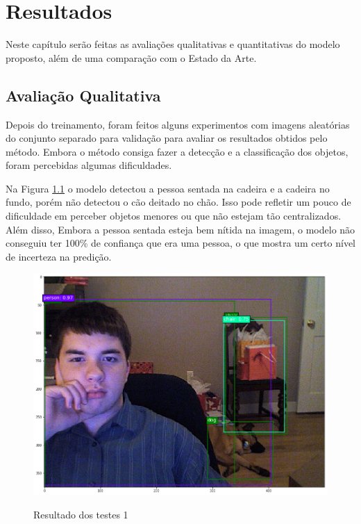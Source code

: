 \chapter{Resultados}
\label{cap:5}
\vspace{-1.9cm}

Neste capítulo serão feitas as avaliações qualitativas e quantitativas do modelo proposto, além de uma comparação com o Estado da Arte.

\vspace{-1.3cm}
\section{Avaliação Qualitativa}
\label{secao:5:1:2}

Depois do treinamento, foram feitos alguns experimentos com imagens aleatórias do conjunto separado para validação para avaliar os resultados obtidos pelo método. Embora o método consiga fazer a detecção e a classificação dos objetos, foram percebidas algumas dificuldades.

Na Figura \ref{fig:teste_1} o modelo detectou a pessoa sentada na cadeira e a cadeira no fundo, porém não detectou o cão deitado no chão. Isso pode refletir um pouco de dificuldade em perceber objetos menores ou que não estejam tão centralizados. Além disso, Embora a pessoa sentada esteja bem nítida na imagem, o modelo não conseguiu ter 100\% de confiança que era uma pessoa, o que mostra um certo nível de incerteza na predição.

\begin{figure}[t]
	\setlength{\abovecaptionskip}{0pt}
	\setlength{\belowcaptionskip}{0pt}
	\caption[Resultado dos testes 1]{Resultado dos testes 1}
	\centering
	\includegraphics[width=.6\textwidth]{imagem/test_image_5.png}
	\captionsetup{justification=centering}
	\label{fig:teste_1}
\end{figure}

